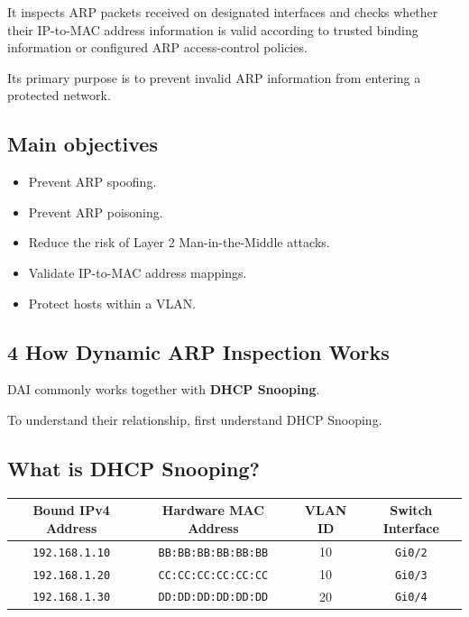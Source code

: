 It inspects ARP packets received on designated interfaces and checks whether their IP-to-MAC address information is valid according to trusted binding information or configured ARP access-control policies.

Its primary purpose is to prevent invalid ARP information from entering a protected network.

\subsection{Main objectives}

\begin{itemize}
\item Prevent ARP spoofing.
\item Prevent ARP poisoning.
\item Reduce the risk of Layer 2 Man-in-the-Middle attacks.
\item Validate IP-to-MAC address mappings.
\item Protect hosts within a VLAN.
\end{itemize}

\subsection{4 How Dynamic ARP Inspection Works}

DAI commonly works together with \textbf{DHCP Snooping}.

To understand their relationship, first understand DHCP Snooping.

\subsection{What is DHCP Snooping?}
\begin{center}
\begin{tabular}{cccc}
\toprule
\textbf{Bound IPv4 Address} & \textbf{Hardware MAC Address} & \textbf{VLAN ID} & \textbf{Switch Interface} \\
\midrule
\texttt{192.168.1.10} & \texttt{BB:BB:BB:BB:BB:BB} & 10 & \texttt{Gi0/2} \\
\texttt{192.168.1.20} & \texttt{CC:CC:CC:CC:CC:CC} & 10 & \texttt{Gi0/3} \\
\texttt{192.168.1.30} & \texttt{DD:DD:DD:DD:DD:DD} & 20 & \texttt{Gi0/4} \\
\bottomrule
\end{tabular}
\end{center}


